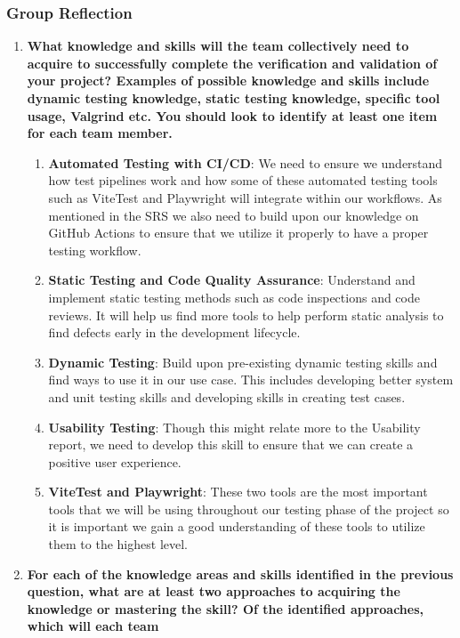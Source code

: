 \documentclass[12pt, titlepage]{article}
\begin{document}
\subsubsection*{Group Reflection}
\begin{enumerate}
 
  \item \textbf{What knowledge and skills will the team collectively need to acquire to successfully complete the verification and validation of your project?
  Examples of possible knowledge and skills include dynamic testing knowledge, static testing knowledge, specific tool usage, Valgrind etc.  You should look to identify at least one item for each team member.}
  \begin {enumerate}
    \item \textbf{Automated Testing with CI/CD}: We need to ensure we understand how test pipelines work and how some of these automated testing tools such as ViteTest and Playwright will integrate within our workflows. As mentioned in the SRS we also need to build upon our knowledge on GitHub Actions to ensure that we utilize it properly to have a proper testing workflow.
    \item \textbf{Static Testing and Code Quality Assurance}: Understand and implement static testing methods such as code inspections and code reviews. It will help us find more tools to help perform static analysis to find defects early in the development lifecycle.
    \item \textbf{Dynamic Testing}: Build upon pre-existing dynamic testing skills and find ways to use it in our use case. This includes developing better system and unit testing skills and developing skills in creating test cases.
    \item \textbf{Usability Testing}: Though this might relate more to the Usability report, we need to develop this skill to ensure that we can create a positive user experience. 
    \item \textbf{ViteTest and Playwright}: These two tools are the most important tools that we will be using throughout our testing phase of the project so it is important we gain a good understanding of these tools to utilize them to the highest level.
  \end{enumerate}
  \item \textbf{For each of the knowledge areas and skills identified in the previous
  question, what are at least two approaches to acquiring the knowledge or
  mastering the skill?  Of the identified approaches, which will each team
}
\end{enumerate}
\end{document}

